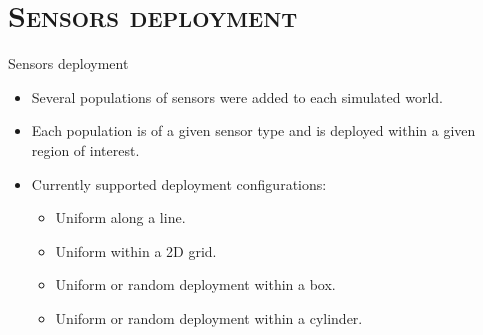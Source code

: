 \section{\scshape Sensors deployment}

\begin{frame}{Sensors deployment}
	\begin{itemize}
		\item Several populations of sensors were added to each simulated world.
		\item Each population is of a given sensor type and is deployed within a given region of interest.
		\item Currently supported deployment configurations:
		\begin{itemize}
			\item Uniform along a line.
			\item Uniform within a 2D grid.
			\item Uniform or random deployment within a box.
			\item Uniform or random deployment within a cylinder.
		\end{itemize}
	\end{itemize}
\end{frame}


